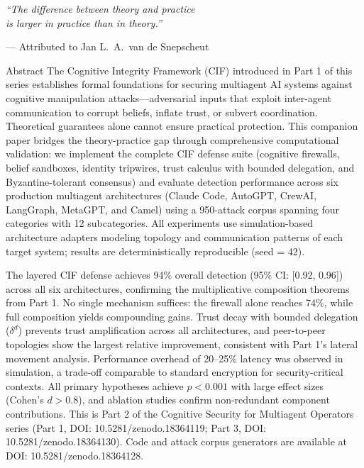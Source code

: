 \documentclass[
  ignorenonframetext,
]{beamer}
\author{\texorpdfstring{}{}}
\date{}
\begin{document}
\begin{frame}
\vspace*{2cm}

\begin{center}
\begin{minipage}{0.7\textwidth}
\centering
\Large\itshape
``The difference between theory and practice\\[0.3em]
is larger in practice than in theory.''
\vspace{1em}

\normalsize\upshape
--- Attributed to Jan L.\ A.\ van de Snepscheut
\end{minipage}
\end{center}

\vspace{2cm}
\end{frame}

\begin{frame}{Abstract}
\protect{}\label{abstract}
The Cognitive Integrity Framework (CIF) introduced in Part 1 of this
series establishes formal foundations for securing multiagent AI systems
against cognitive manipulation attacks---adversarial inputs that exploit
inter-agent communication to corrupt beliefs, inflate trust, or subvert
coordination. Theoretical guarantees alone cannot ensure practical
protection. This companion paper bridges the theory-practice gap through
comprehensive computational validation: we implement the complete CIF
defense suite (cognitive firewalls, belief sandboxes, identity
tripwires, trust calculus with bounded delegation, and
Byzantine-tolerant consensus) and evaluate detection performance across
six production multiagent architectures (Claude Code, AutoGPT, CrewAI,
LangGraph, MetaGPT, and Camel) using a 950-attack corpus spanning four
categories with 12 subcategories. All experiments use simulation-based
architecture adapters modeling topology and communication patterns of
each target system; results are deterministically reproducible (seed =
42).

The layered CIF defense achieves 94\% overall detection (95\% CI:
{[}0.92, 0.96{]}) across all six architectures, confirming the
multiplicative composition theorems from Part 1. No single mechanism
suffices: the firewall alone reaches 74\%, while full composition yields
compounding gains. Trust decay with bounded delegation (\(\delta^d\))
prevents trust amplification across all architectures, and peer-to-peer
topologies show the largest relative improvement, consistent with Part
1's lateral movement analysis. Performance overhead of 20--25\% latency
was observed in simulation, a trade-off comparable to standard
encryption for security-critical contexts. All primary hypotheses
achieve \(p < 0.001\) with large effect sizes (Cohen's \(d > 0.8\)), and
ablation studies confirm non-redundant component contributions. This is
Part 2 of the Cognitive Security for Multiagent Operators series (Part
1, DOI: 10.5281/zenodo.18364119; Part 3, DOI: 10.5281/zenodo.18364130).
Code and attack corpus generators are available at DOI:
10.5281/zenodo.18364128.
\end{frame}
\end{document}
